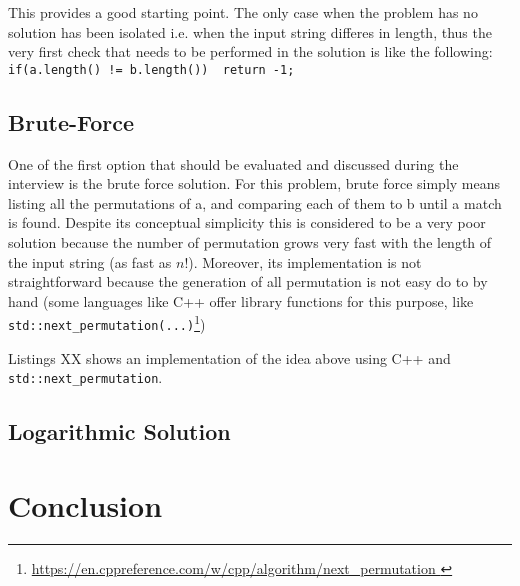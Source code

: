  This provides a good starting point. The only case when the problem has no solution has been isolated i.e. when the input string differes in length, thus the  very first check that needs to be performed in the solution is like the following: \lstinline[columns=fixed]{if(a.length() != b.length())  return -1;}



\subsection{Brute-Force}
One of the first option that should be evaluated and discussed during the interview is the brute force solution. For this problem, brute force simply means listing all the permutations of a, and comparing each of them to b until a match is found. Despite its conceptual simplicity this is considered to be a very poor solution because the number of permutation grows very fast with the length of the input string (as fast as $n!$).  Moreover, its implementation  is not straightforward because the generation of all permutation is not easy do to by hand (some languages like C++ offer library functions for this purpose, like \lstinline[columns=fixed]{std::next_permutation(...)}\footnote{\url{https://en.cppreference.com/w/cpp/algorithm/next_permutation }})

Listings XX shows an implementation of the idea above using C++ and \lstinline[columns=fixed]{std::next_permutation}.





\subsection{Logarithmic Solution}


\section{Conclusion}